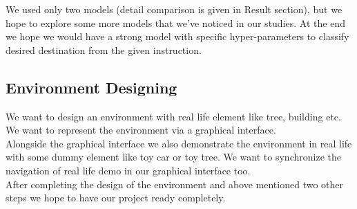 We used only two models (detail comparison is given in Result section), but we hope to explore some more models that we've noticed in our studies. At the end we hope we would have a strong model with specific hyper-parameters to classify desired destination from the given instruction.\\

\subsection{Environment Designing}
We want to design an environment with real life element like tree, building etc. We want to represent the environment via a graphical interface.\\

Alongside the graphical interface we also demonstrate the environment in real life with some dummy element like toy car or toy tree. We want to synchronize the navigation of real life demo in our graphical interface too.\\

After completing the design of the environment and above mentioned two other steps we hope to have our project ready completely.	
	
	 
		

	
